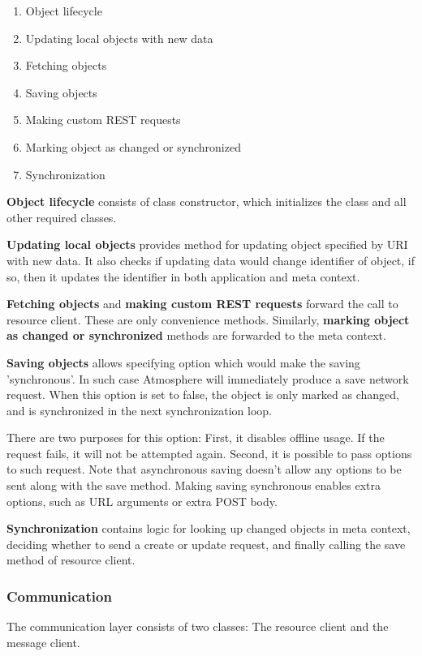 \begin{enumerate}
\item Object lifecycle
\item Updating local objects with new data
\item Fetching objects
\item Saving objects
\item Making custom REST requests
\item Marking object as changed or synchronized
\item Synchronization
\end{enumerate}

\textbf{Object lifecycle} consists of class constructor, which initializes the class and all other required classes.

\textbf{Updating local objects} provides method for updating object specified by URI with new data. It also checks if updating data would change identifier of object, if so, then it updates the identifier in both application and meta context.

\textbf{Fetching objects} and \textbf{making custom REST requests} forward the call to resource client. These are only convenience methods. Similarly, \textbf{marking object as changed or synchronized} methods are forwarded to the meta context.

\textbf{Saving objects} allows specifying option which would make the saving 'synchronous'. In such case Atmosphere will immediately produce a save network request. When this option is set to false, the object is only marked as changed, and is synchronized in the next synchronization loop.

There are two purposes for this option: First, it disables offline usage. If the request fails, it will not be attempted again. Second, it is possible to pass options to such request. Note that asynchronous saving doesn't allow any options to be sent along with the save method. Making saving synchronous enables extra options, such as URL arguments or extra POST body.

\textbf{Synchronization} contains logic for looking up changed objects in meta context, deciding whether to send a create or update request, and finally calling the save method of resource client.

\subsubsection{Communication}

The communication layer consists of two classes: The resource client and the message client.


